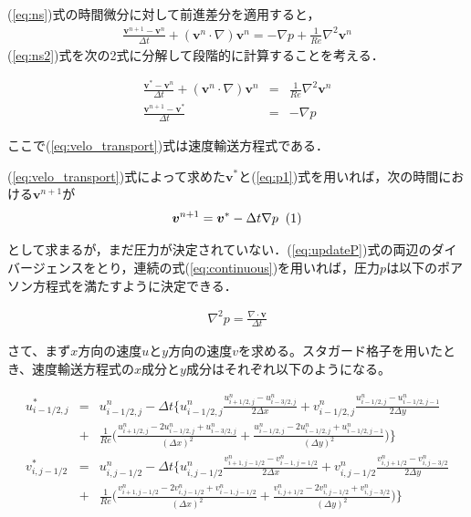 \documentclass[twocolumn,oneside,a4paper]{article}
\newcommand\inlineeqno{\stepcounter{equation}\ (\theequation)}
\begin{document}
(\ref{eq:ns})式の時間微分に対して前進差分を適用すると，
\begin{eqnarray}\label{eq:ns2}
     \frac{\bm{v}^{n+1}-\bm{v}^n}{\Delta t} + (\bm{v}^n \cdot \nabla )\bm{v}^n = - \nabla p + \frac{1}{Re} \nabla^2 \bm{v}^n
\end{eqnarray}
(\ref{eq:ns2})式を次の2式に分解して段階的に計算することを考える．

\begin{eqnarray}
     \frac{\bm{v}^{\ast}-\bm{v}^n}{\Delta t} + (\bm{v}^n \cdot \nabla )\bm{v}^n &=& \frac{1}{Re} \nabla^2 \bm{v}^n \label{eq:velo_transport}\\
     \frac{\bm{v}^{n+1}-\bm{v}^{\ast}}{\Delta t} &=& - \nabla p     \label{eq:p1}
\end{eqnarray}

ここで(\ref{eq:velo_transport})式は速度輸送方程式である．

(\ref{eq:velo_transport})式によって求めた$\bm{v}^\ast$と(\ref{eq:p1})式を用いれば，次の時間における$\bm{v}^{n+1}$が
\begin{eqnarray}
\bm{v}^{n+1}=\bm{v}^{\ast}-\Delta t \nabla p \: \inlineeqno \label{eq:updateP}    
\end{eqnarray}

として求まるが，まだ圧力が決定されていない．(\ref{eq:updateP})式の両辺のダイバージェンスをとり，連続の式(\ref{eq:continuous})を用いれば，圧力$p$は以下のポアソン方程式を満たすように決定できる．

\begin{eqnarray}\label{eq:poisson}
     \nabla^2 p = \frac{\nabla \cdot \bm{v}}{\Delta t}
\end{eqnarray}


さて、まず$x$方向の速度$u$と$y$方向の速度$v$を求める。スタガード格子を用いたとき、速度輸送方程式の$x$成分と$y$成分はそれぞれ以下のようになる。

\begin{strip}
\begin{eqnarray}         
     u^\ast_{i-1/2,j} &=& u^n_{i-1/2,j} - \Delta t \Bigg \{u^n_{i-1/2,j}\frac{u^n_{i+1/2,j}-u^n_{i-3/2,j}}{2\Delta x}+ v^n_{i-1/2,j}\frac{u^n_{i-1/2,j}-u^n_{i-1/2,j-1}}{2\Delta y} \nonumber \\
     &+& \frac{1}{Re}\Bigg( \frac{u^n_{i+1/2,j}-2u^n_{i-1/2,j}+u^n_{i-3/2,j}}{(\Delta x)^2}+\frac{u^n_{i-1/2,j}-2u^n_{i-1/2,j}+u^n_{i-1/2,j-1}}{(\Delta y)^2} \Bigg) \Bigg\} \\
     v^\ast_{i,j-1/2} &=& u^n_{i,j-1/2} - \Delta t \Bigg \{u^n_{i,j-1/2}\frac{v^n_{i+1,j-1/2}-v^n_{i-1,j=1/2}}{2\Delta x}+ v^n_{i,j-1/2}\frac{v^n_{i,j+1/2}-v^n_{i,j-3/2}}{2\Delta y} \nonumber \\
     &+& \frac{1}{Re}\Bigg( \frac{v^n_{i+1,j-1/2}-2v^n_{i,j-1/2}+v^n_{i-1,j-1/2}}{(\Delta x)^2}+\frac{v^n_{i,j+1/2}-2v^n_{i,j-1/2}+v^n_{i,j-3/2}}{(\Delta y)^2} \Bigg) \Bigg\}
\end{eqnarray}
\end{strip}
\end{document}
